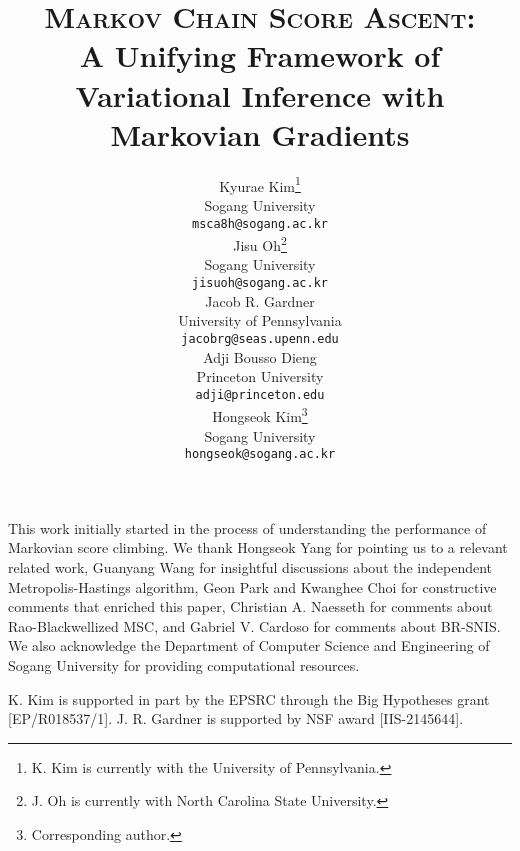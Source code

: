 \documentclass{article}
\title{\textsc{Markov Chain Score Ascent}: \\ A Unifying Framework of \\ Variational Inference with Markovian Gradients}
\author{%
  Kyurae Kim\thanks{K. Kim is currently with the University of Pennsylvania.} \\
  Sogang University\\
  \texttt{msca8h@sogang.ac.kr} \\
  \And
  Jisu Oh\thanks{J. Oh is currently with North Carolina State University.} \\
  Sogang University \\
  \texttt{jisuoh@sogang.ac.kr} \\
  \AND
  Jacob R. Gardner  \\
  University of Pennsylvania \\
  \texttt{jacobrg@seas.upenn.edu} \\
  \And
  Adji Bousso Dieng \\
  Princeton University \\
  \texttt{adji@princeton.edu} \\
  \And
  Hongseok Kim\thanks{Corresponding author.} \\
  Sogang University \\
  \texttt{hongseok@sogang.ac.kr} \\
}
\begin{document}
\maketitle

\begin{abstract}
  
\end{abstract}









\begin{ack}
  This work initially started in the process of understanding the performance of Markovian score climbing.
  We thank Hongseok Yang for pointing us to a relevant related work, Guanyang Wang for insightful discussions about the independent Metropolis-Hastings algorithm, Geon Park and Kwanghee Choi for constructive comments that enriched this paper, Christian A. Naesseth for comments about Rao-Blackwellized MSC, and Gabriel V. Cardoso for comments about BR-SNIS.
  We also acknowledge the Department of Computer Science and Engineering of Sogang University for providing computational resources.

  K. Kim is supported in part by the EPSRC through the Big Hypotheses grant [EP/R018537/1].
  J. R. Gardner is supported by NSF award [IIS-2145644].
\end{ack}

%

\newpage
\appendix


\end{document}
